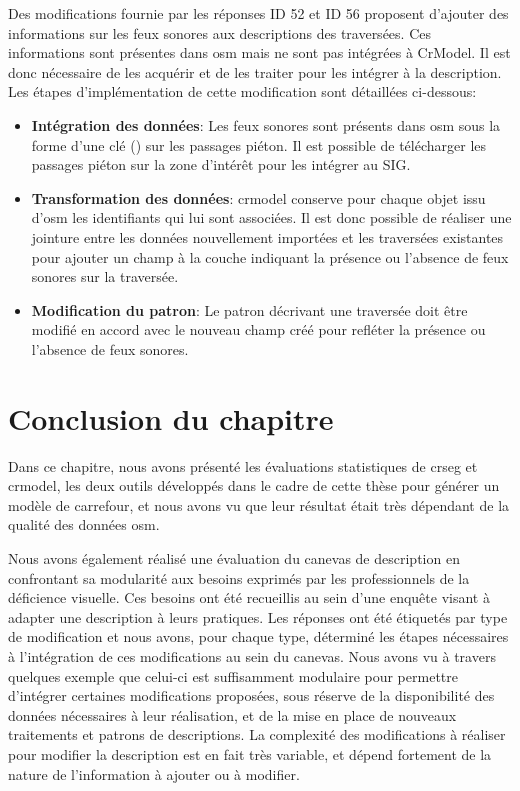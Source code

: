 \newpar{}

Des modifications fournie par les réponses ID 52 et ID 56 proposent d'ajouter des informations sur les feux sonores aux descriptions des traversées. Ces informations sont présentes dans \gls{osm} mais ne sont pas intégrées à CrModel. Il est donc nécessaire de les acquérir et de les traiter pour les intégrer à la description. Les étapes d'implémentation de cette modification sont détaillées ci-dessous:

\begin{itemize}
    \item \textbf{Intégration des données}: Les feux sonores sont présents dans \gls{osm} sous la forme d'une clé () sur les passages piéton. Il est possible de télécharger les passages piéton sur la zone d'intérêt pour les intégrer au SIG.
    \item \textbf{Transformation des données}: crmodel conserve pour chaque objet issu d'\gls{osm} les identifiants qui lui sont associées. Il est donc possible de réaliser une jointure entre les données nouvellement importées et les traversées existantes pour ajouter un champ à la couche indiquant la présence ou l'absence de feux sonores sur la traversée.
    \item \textbf{Modification du patron}: Le patron décrivant une traversée doit être modifié en accord avec le nouveau champ créé pour refléter la présence ou l'absence de feux sonores.
\end{itemize}

\section{Conclusion du chapitre}

Dans ce chapitre, nous avons présenté les évaluations statistiques de crseg et crmodel, les deux outils développés dans le cadre de cette thèse pour générer un modèle de carrefour,  et nous avons vu que leur résultat était très dépendant de la qualité des données \gls{osm}. 

\newpar{}

Nous avons également réalisé une évaluation du canevas de description en confrontant sa modularité aux besoins exprimés par les professionnels de la déficience visuelle. Ces besoins ont été recueillis au sein d'une enquête visant à adapter une description à leurs pratiques. Les réponses ont été étiquetés par type de modification et nous avons, pour chaque type, déterminé les étapes nécessaires à l'intégration de ces modifications au sein du canevas. Nous avons vu à travers quelques exemple que celui-ci est suffisamment modulaire pour permettre d'intégrer certaines modifications proposées, sous réserve de la disponibilité des données nécessaires à leur réalisation, et de la mise en place de nouveaux traitements et patrons de descriptions. La complexité des modifications à réaliser pour modifier la description est en fait très variable, et dépend fortement de la nature de l'information à ajouter ou à modifier.